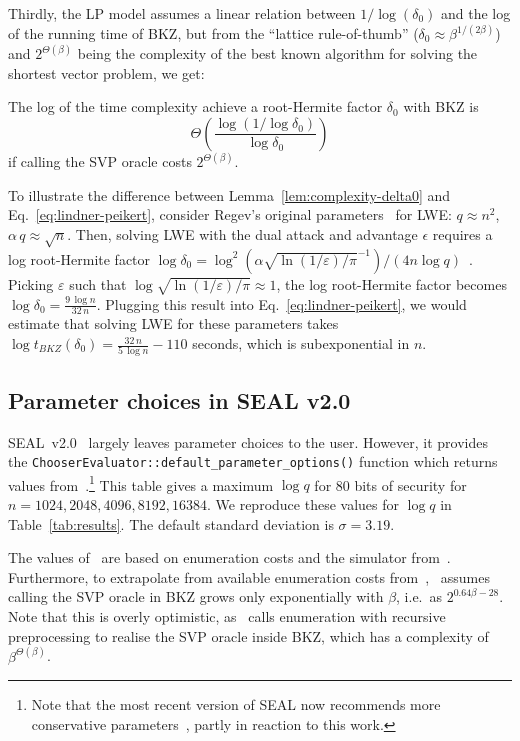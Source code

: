 \documentclass[a4paper]{llncs}
\begin{document}
Thirdly, the LP model assumes a linear relation between \(1/\log(δ_0)\) and the log of the running time of BKZ, but from the ``lattice rule-of-thumb'' (\(δ_0 ≈ β^{1/(2β)}\)) and $2^{Θ(β)}$ being the complexity of the best known algorithm for solving the shortest vector problem, we get:

\begin{lemma}\label{lem:complexity-delta0}
The log of the time complexity achieve a root-Hermite factor \(δ_0\) with BKZ is
\[Θ \left( \frac{\log(1/\log δ_0)}{\log δ_0} \right)\]
if calling the SVP oracle costs \(2^{Θ(β)}\).
\end{lemma}

To illustrate the difference between Lemma~\ref{lem:complexity-delta0} and Eq.~\eqref{eq:lindner-peikert}, consider Regev's original parameters~\cite{STOC:Regev05} for LWE\@: $q ≈ n^2$, $α\,q ≈ \sqrt{n}$. Then, solving LWE with the dual attack and advantage $\epsilon$ requires a log root-Hermite factor $\log δ_0 ={\log^2{\left(\alpha {\sqrt{\ln({1/ε})/π}}^{-1} \right)}}/{(4n \log{q})}$~\cite{JMC:AlbPlaSco15}. Picking $ε$ such that \(\log{\sqrt{\ln(1/ε)/π}} ≈ 1\), the log root-Hermite factor becomes \(\log δ_0 = \frac{9\, \log n }{32\,n}\). Plugging this result into Eq.~\ref{eq:lindner-peikert}, we would estimate that solving LWE for these parameters takes \( \log t_{BKZ}(δ_0) = \frac{32\, n}{5\, \log n }-110\) seconds, which is subexponential in $n$.

\subsection{Parameter choices in SEAL v2.0}\label{sec:parameters-seal}

SEAL~v2.0~\cite{LaiPla16} largely leaves parameter choices to the user. However, it provides the \lstinline{ChooserEvaluator::default_parameter_options()} function which returns values from~\cite[Table~2]{AFRICACRYPT:LepNae14}.\footnote{Note that the most recent version of SEAL now recommends more conservative parameters~\cite{LaiChePla16}, partly in reaction to this work.} This table gives a maximum $\log q$ for 80 bits of security for $n=1024, 2048, 4096, 8192, 16384$. We reproduce these values for \(\log q\) in Table~\ref{tab:results}. The default standard deviation is $σ=3.19$.

The values of~\cite[Table~2]{AFRICACRYPT:LepNae14} are based on enumeration costs and the simulator from~\cite{AC:CheNgu11,CheNgu12}. Furthermore, to extrapolate from available enumeration costs from~\cite{CheNgu12},~\cite{AFRICACRYPT:LepNae14} assumes calling the SVP oracle in BKZ grows only exponentially with \(\beta\), i.e. as \(2^{0.64\beta - 28}\). Note that this is overly optimistic, as~\cite{CheNgu12} calls enumeration with recursive preprocessing to realise the SVP oracle inside BKZ, which has a complexity of $\beta^{\Theta(β)}$. 
\end{document}
